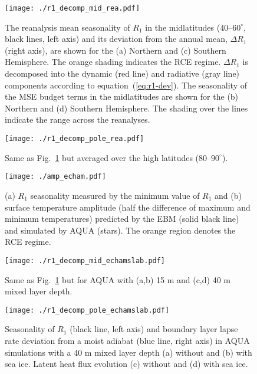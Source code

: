 \documentclass{ametsocV5}
\begin{document}
\begin{figure}[t]
  \noindent\texttt{[image: ./r1\_decomp\_mid\_rea.pdf]}\\
  \caption{The reanalysis mean seasonality of $R_{1}$ in the midlatitudes ($40$--$60^{\circ}$, black lines, left axis) and its deviation from the annual mean, $\Delta R_1$ (right axis), are shown for the (a) Northern and (c) Southern Hemisphere. The orange shading indicates the RCE regime. $\Delta R_1$ is decomposed into the dynamic (red line) and radiative (gray line) components according to equation~(\ref{eq:r1-dev}). The seasonality of the MSE budget terms in the midlatitudes are shown for the (b) Northern and (d) Southern Hemisphere. The shading over the lines indicate the range across the reanalyses.}
  \label{fig:rea-r1-decomp-mid}
\end{figure}

\begin{figure}[t]
  \noindent\texttt{[image: ./r1\_decomp\_pole\_rea.pdf]}\\
  \caption{Same as Fig.~\ref{fig:rea-r1-decomp-mid} but averaged over the high latitudes ($80$--$90^{\circ}$).}
  \label{fig:rea-r1-decomp-pole}
\end{figure}

\begin{figure}
  \noindent\texttt{[image: ./amp\_echam.pdf]}\\
  \caption{(a) $R_1$ seasonality measured by the minimum value of $R_1$ and (b) surface temperature amplitude (half the difference of maximum and minimum temperatures) predicted by the EBM (solid black line) and simulated by AQUA (stars). The orange region denotes the RCE regime.}
  \label{fig:amp-r1-echam}
\end{figure}

\begin{figure}[t]
    \noindent\texttt{[image: ./r1\_decomp\_mid\_echamslab.pdf]}\\
    \caption{Same as Fig.~\ref{fig:rea-r1-decomp-mid} but for AQUA with (a,b) 15 m and (c,d) 40 m mixed layer depth.}
\label{fig:echam-rce}
\end{figure}

\begin{figure}[t]
    \noindent\texttt{[image: ./r1\_decomp\_pole\_echamslab.pdf]}\\
    \caption{Seasonality of $R_1$ (black line, left axis) and boundary layer lapse rate deviation from a moist adiabat (blue line, right axis) in AQUA simulations with a 40 m mixed layer depth (a) without and (b) with sea ice. Latent heat flux evolution (c) without and (d) with sea ice.}
    \label{fig:echam-rae}
\end{figure}
\end{document}
